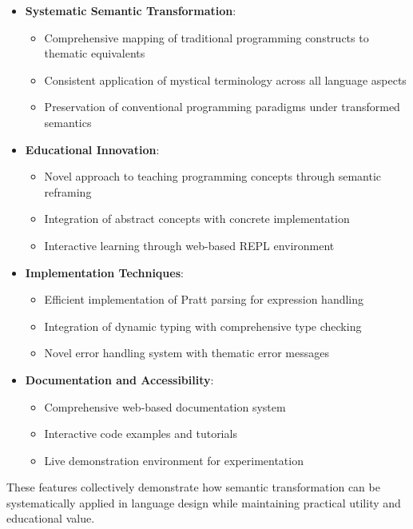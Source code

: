 \documentclass[conference]{IEEEtran}
\begin{document}
\begin{itemize}
    \item \textbf{Systematic Semantic Transformation}: 
    \begin{itemize}
        \item Comprehensive mapping of traditional programming constructs to thematic equivalents
        \item Consistent application of mystical terminology across all language aspects
        \item Preservation of conventional programming paradigms under transformed semantics
    \end{itemize}
    
    \item \textbf{Educational Innovation}:
    \begin{itemize}
        \item Novel approach to teaching programming concepts through semantic reframing
        \item Integration of abstract concepts with concrete implementation
        \item Interactive learning through web-based REPL environment
    \end{itemize}
    
    \item \textbf{Implementation Techniques}:
    \begin{itemize}
        \item Efficient implementation of Pratt parsing for expression handling
        \item Integration of dynamic typing with comprehensive type checking
        \item Novel error handling system with thematic error messages
    \end{itemize}
    
    \item \textbf{Documentation and Accessibility}:
    \begin{itemize}
        \item Comprehensive web-based documentation system
        \item Interactive code examples and tutorials
        \item Live demonstration environment for experimentation
    \end{itemize}
\end{itemize}

These features collectively demonstrate how semantic transformation can be systematically applied in language design while maintaining practical utility and educational value.
\end{document}
